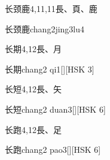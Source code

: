\begin{Entry}{长颈鹿}{4,11,11}{⾧、⾴、⿅}
  \begin{Phonetics}{长颈鹿}{chang2jing3lu4}
  \end{Phonetics}
\end{Entry}

\begin{Entry}{长期}{4,12}{⾧、⽉}
  \begin{Phonetics}{长期}{chang2 qi1}[][HSK 3]
  \end{Phonetics}
\end{Entry}

\begin{Entry}{长短}{4,12}{⾧、⽮}
  \begin{Phonetics}{长短}{chang2 duan3}[][HSK 6]
  \end{Phonetics}
\end{Entry}

\begin{Entry}{长跑}{4,12}{⾧、⾜}
  \begin{Phonetics}{长跑}{chang2 pao3}[][HSK 6]
  \end{Phonetics}
\end{Entry}



